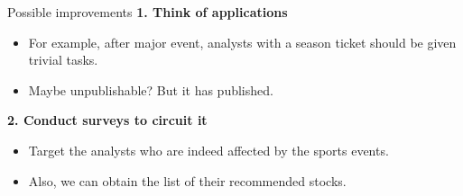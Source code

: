 \documentclass[]{beamer}
\begin{document}
\begin{frame}
\begin{columns}
        \begin{block}{\small{Possible improvements}}
            \small \textbf{\alert{1.} Think of applications}\\\vskip 0.01cm
                \scriptsize
                \begin{itemize}
                \item For example, after major event, analysts with a season ticket should be given trivial tasks.
                \item Maybe unpublishable? But it has published.
                \end{itemize}
   
            \small \textbf{\alert{2.} Conduct surveys to circuit it}\\
                \tiny
                \begin{itemize}
                \scriptsize 
                \item Target the analysts who are indeed affected by the sports events.
                \item Also, we can obtain the list of their recommended stocks.\\~\\
                \vskip 0.6cm
                 \textit{}
                \end{itemize}
        \end{block}
 
 \end{columns}

 
 \end{frame}
\end{document}
